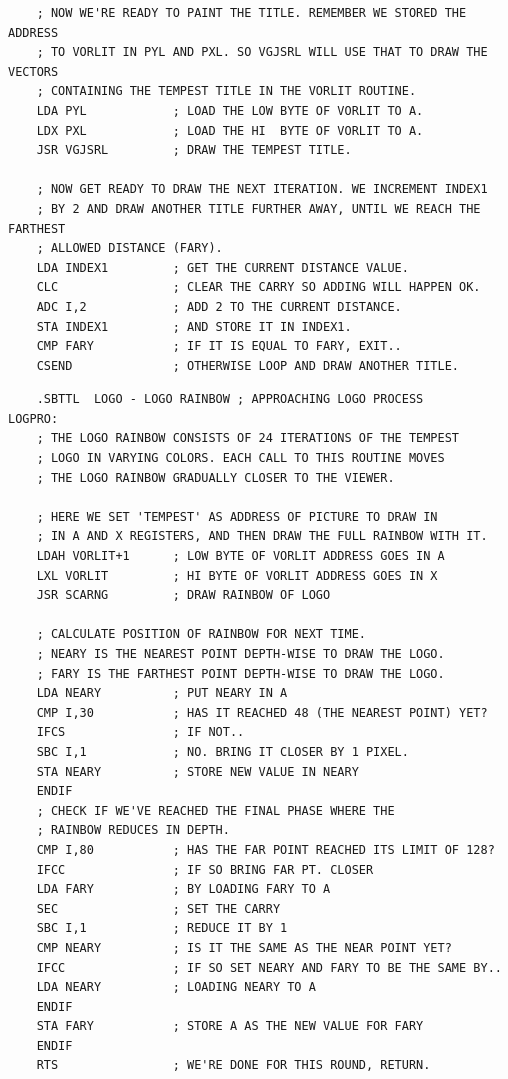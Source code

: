 \begin{lstlisting}
    ; NOW WE'RE READY TO PAINT THE TITLE. REMEMBER WE STORED THE ADDRESS
    ; TO VORLIT IN PYL AND PXL. SO VGJSRL WILL USE THAT TO DRAW THE VECTORS
    ; CONTAINING THE TEMPEST TITLE IN THE VORLIT ROUTINE.
    LDA PYL            ; LOAD THE LOW BYTE OF VORLIT TO A.
    LDX PXL            ; LOAD THE HI  BYTE OF VORLIT TO A.
    JSR VGJSRL         ; DRAW THE TEMPEST TITLE.
    
    ; NOW GET READY TO DRAW THE NEXT ITERATION. WE INCREMENT INDEX1
    ; BY 2 AND DRAW ANOTHER TITLE FURTHER AWAY, UNTIL WE REACH THE FARTHEST
    ; ALLOWED DISTANCE (FARY).
    LDA INDEX1         ; GET THE CURRENT DISTANCE VALUE.
    CLC                ; CLEAR THE CARRY SO ADDING WILL HAPPEN OK.
    ADC I,2            ; ADD 2 TO THE CURRENT DISTANCE.
    STA INDEX1         ; AND STORE IT IN INDEX1.
    CMP FARY           ; IF IT IS EQUAL TO FARY, EXIT..
    CSEND              ; OTHERWISE LOOP AND DRAW ANOTHER TITLE.
\end{lstlisting}

\begin{lstlisting}
    .SBTTL  LOGO - LOGO RAINBOW ; APPROACHING LOGO PROCESS
LOGPRO: 
    ; THE LOGO RAINBOW CONSISTS OF 24 ITERATIONS OF THE TEMPEST
    ; LOGO IN VARYING COLORS. EACH CALL TO THIS ROUTINE MOVES
    ; THE LOGO RAINBOW GRADUALLY CLOSER TO THE VIEWER.

    ; HERE WE SET 'TEMPEST' AS ADDRESS OF PICTURE TO DRAW IN 
    ; IN A AND X REGISTERS, AND THEN DRAW THE FULL RAINBOW WITH IT.
    LDAH VORLIT+1      ; LOW BYTE OF VORLIT ADDRESS GOES IN A
    LXL VORLIT         ; HI BYTE OF VORLIT ADDRESS GOES IN X
    JSR SCARNG         ; DRAW RAINBOW OF LOGO

    ; CALCULATE POSITION OF RAINBOW FOR NEXT TIME.
    ; NEARY IS THE NEAREST POINT DEPTH-WISE TO DRAW THE LOGO.
    ; FARY IS THE FARTHEST POINT DEPTH-WISE TO DRAW THE LOGO.
    LDA NEARY          ; PUT NEARY IN A
    CMP I,30           ; HAS IT REACHED 48 (THE NEAREST POINT) YET?
    IFCS               ; IF NOT..
    SBC I,1            ; NO. BRING IT CLOSER BY 1 PIXEL.
    STA NEARY          ; STORE NEW VALUE IN NEARY
    ENDIF
    ; CHECK IF WE'VE REACHED THE FINAL PHASE WHERE THE
    ; RAINBOW REDUCES IN DEPTH.
    CMP I,80           ; HAS THE FAR POINT REACHED ITS LIMIT OF 128?
    IFCC               ; IF SO BRING FAR PT. CLOSER
    LDA FARY           ; BY LOADING FARY TO A
    SEC                ; SET THE CARRY
    SBC I,1            ; REDUCE IT BY 1
    CMP NEARY          ; IS IT THE SAME AS THE NEAR POINT YET?
    IFCC               ; IF SO SET NEARY AND FARY TO BE THE SAME BY..
    LDA NEARY          ; LOADING NEARY TO A
    ENDIF
    STA FARY           ; STORE A AS THE NEW VALUE FOR FARY
    ENDIF
    RTS                ; WE'RE DONE FOR THIS ROUND, RETURN.
\end{lstlisting}
